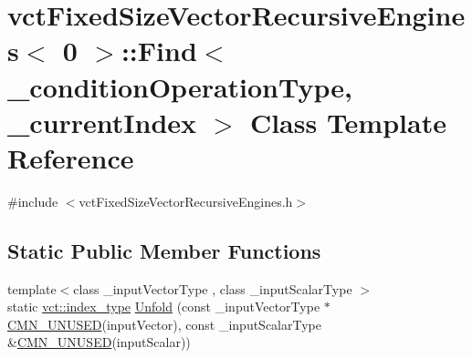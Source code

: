 \hypertarget{classvct_fixed_size_vector_recursive_engines_3_010_01_4_1_1_find}{\section{vct\-Fixed\-Size\-Vector\-Recursive\-Engines$<$ 0 $>$\-:\-:Find$<$ \-\_\-condition\-Operation\-Type, \-\_\-current\-Index $>$ Class Template Reference}
\label{classvct_fixed_size_vector_recursive_engines_3_010_01_4_1_1_find}
}


{\ttfamily \#include $<$vct\-Fixed\-Size\-Vector\-Recursive\-Engines.\-h$>$}

\subsection*{Static Public Member Functions}
\begin{DoxyCompactItemize}
\item 
{\footnotesize template$<$class \-\_\-input\-Vector\-Type , class \-\_\-input\-Scalar\-Type $>$ }\\static \hyperlink{namespacevct_a50405d87494dce1f22ee3930ca285ee9}{vct\-::index\-\_\-type} \hyperlink{classvct_fixed_size_vector_recursive_engines_3_010_01_4_1_1_find_a36555789351dc612d8d924aba0640b7d}{Unfold} (const \-\_\-input\-Vector\-Type $\ast$\hyperlink{cmn_portability_8h_a021894e2626935fa2305434b1e893ff6}{C\-M\-N\-\_\-\-U\-N\-U\-S\-E\-D}(input\-Vector), const \-\_\-input\-Scalar\-Type \&\hyperlink{cmn_portability_8h_a021894e2626935fa2305434b1e893ff6}{C\-M\-N\-\_\-\-U\-N\-U\-S\-E\-D}(input\-Scalar))
\end{DoxyCompactItemize}


